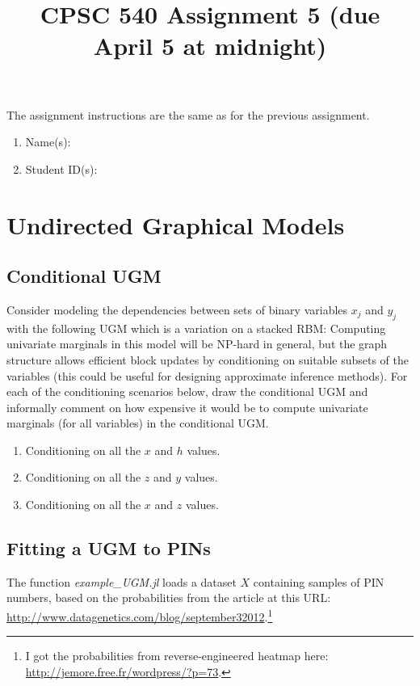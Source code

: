 \documentclass{article}
\def\blu#1{{\color{blu}#1}}
\newcommand{\centerfig}[2]{\begin{center}\texttt{[image: a5f/\#2]}\end{center}}
\def\enum#1{\begin{enumerate}#1\end{enumerate}}
\begin{document}
\title{CPSC 540 Assignment 5 (due April 5 at midnight)}
\author{}
\date{}
\maketitle
\vspace{-4em}

The assignment instructions are the same as for the previous assignment.


\blu{\enum{
\item Name(s):
\item Student ID(s):
}}


\section{Undirected Graphical Models}

\subsection{Conditional UGM}

Consider modeling the dependencies between sets of binary variables $x_j$ and $y_j$ with the following UGM which is a variation on a stacked RBM:
Computing univariate marginals in this model will be NP-hard in general, but the graph structure allows efficient block updates by conditioning on suitable subsets of the variables (this could be useful for designing approximate inference methods).
For each of the conditioning scenarios below, \blu{draw the conditional UGM and informally comment on how expensive it would be to compute univariate marginals} (for all variables) in the conditional UGM.
\enum{
\item Conditioning on all the $x$ and $h$ values.
\item Conditioning on all the $z$ and $y$ values.
\item Conditioning on all the $x$ and $z$ values.
}



\subsection{Fitting a UGM to PINs}


The function \emph{example\_UGM.jl} loads a dataset $X$ containing samples of PIN numbers, based on the probabilities from the article at this URL: \url{http://www.datagenetics.com/blog/september32012}.\footnote{I got the probabilities from reverse-engineered heatmap here: \url{http://jemore.free.fr/wordpress/?p=73}.}
\end{document}
